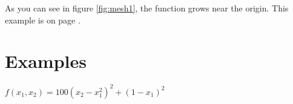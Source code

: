 \documentclass[letterpaper, oneside]{book}
\begin{document}
	As you can see in figure \ref{fig:mesh1}, the function grows near the origin. This example is on page \pageref{fig:mesh1}.




	
	
	

	
	
	
\chapter{Examples}

\begin{math}
	f(x_1, x_2) = 100 (x_2 - x_{1}^2)^2 + (1 - x_1)^2
\end{math}
\end{document}
